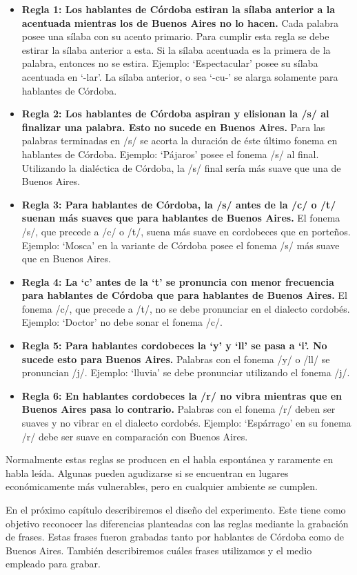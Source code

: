 \begin{itemize}

\item \textbf{Regla 1: Los hablantes de Córdoba estiran la sílaba anterior a la acentuada mientras los de Buenos Aires no lo hacen.} Cada palabra posee una sílaba con su acento primario. Para cumplir esta regla se debe estirar la sílaba anterior a esta. Si la sílaba acentuada es la primera de la palabra, entonces no se estira. Ejemplo: `Espectacular' posee su sílaba acentuada en `-lar'. La sílaba anterior, o sea `-cu-' se alarga solamente para hablantes de Córdoba. 

\item \textbf{Regla 2: Los hablantes de Córdoba aspiran y elisionan la /s/ al finalizar una palabra. Esto no sucede en Buenos Aires.} Para las palabras terminadas en /s/ se acorta la duración de éste último fonema en hablantes de Córdoba. Ejemplo: `Pájaros' posee el fonema /s/ al final. Utilizando la dialéctica de Córdoba, la /s/ final sería más suave que una de Buenos Aires. 

\item \textbf{Regla 3: Para hablantes de Córdoba, la /s/ antes de la /c/ o /t/ suenan más suaves que para hablantes de Buenos Aires.} El fonema /s/, que precede a /c/ o /t/, suena más suave en cordobeces que en porteños. Ejemplo: `Mosca' en la variante de Córdoba posee el fonema /s/ más suave que en Buenos Aires.

\item \textbf{Regla 4: La `c' antes de la `t' se pronuncia con menor frecuencia para hablantes de Córdoba que para hablantes de Buenos Aires.} El fonema /c/, que precede a /t/, no se debe pronunciar en el dialecto cordobés. Ejemplo: `Doctor' no debe sonar el fonema /c/.

\item \textbf{Regla 5: Para hablantes cordobeces la `y’ y `ll’ se pasa a `i’. No sucede esto para Buenos Aires.} Palabras con el fonema /y/ o /ll/ se pronuncian /j/. Ejemplo: `lluvia' se debe pronunciar utilizando el fonema /j/. 

\item \textbf{Regla 6: En hablantes cordobeces la /r/ no vibra mientras que en Buenos Aires pasa lo contrario.} Palabras con el fonema /r/ deben ser suaves y no vibrar en el dialecto cordobés. Ejemplo: `Espárrago' en su fonema /r/ debe ser suave en comparación con Buenos Aires. 

\end{itemize}

Normalmente estas reglas se producen en el habla espontánea y raramente en habla leída. Algunas pueden agudizarse si se encuentran en lugares económicamente más vulnerables, pero en cualquier ambiente se cumplen.

En el próximo capítulo describiremos el diseño del experimento. Este tiene como objetivo reconocer las diferencias planteadas con las reglas mediante la grabación de frases. Estas frases fueron grabadas tanto por hablantes de Córdoba como de Buenos Aires. También describiremos cuáles frases utilizamos y el medio empleado para grabar.
